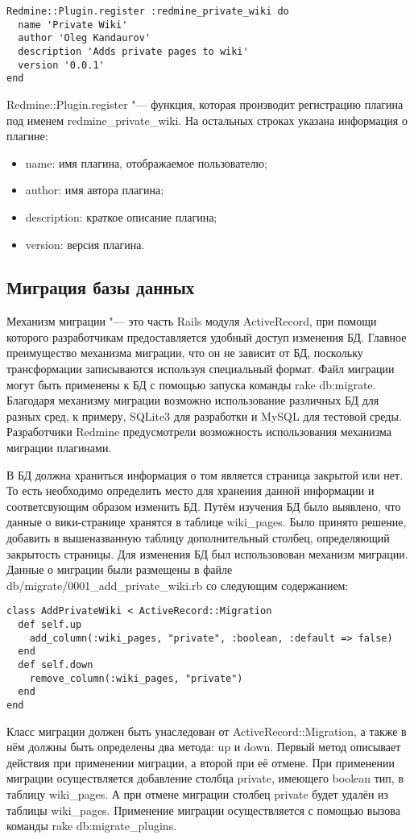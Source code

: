 \small{
\begin{lstlisting}
Redmine::Plugin.register :redmine_private_wiki do
  name 'Private Wiki'
  author 'Oleg Kandaurov'
  description 'Adds private pages to wiki'
  version '0.0.1'
end
\end{lstlisting}}

Redmine::Plugin.register "--- функция, которая производит регистрацию плагина
под именем redmine\_private\_wiki. На остальных строках указана информация о
плагине:
\begin{itemize} 
  \item name: имя плагина, отображаемое пользователю;
  \item author: имя автора плагина;
  \item description: краткое описание плагина;
  \item version: версия плагина.
\end{itemize}

\subsection{Миграция базы данных} 
Механизм миграции "--- это часть Rails модуля ActiveRecord, при помощи которого
разработчикам предоставляется удобный доступ изменения БД. Главное преимущество
механизма миграции, что он не зависит от БД, поскольку трансформации
записываются используя специальный формат. Файл миграции могут быть применены к
БД с помощью запуска команды rake db:migrate. Благодаря механизму миграции
возможно использование различных БД для разных сред, к примеру, SQLite3 для
разработки и MySQL для тестовой среды. Разработчики Redmine предусмотрели
возможность использования механизма миграции плагинами.

В БД должна храниться информация о том является страница закрытой или нет. То
есть необходимо определить место для хранения данной информации и
соответсвующим образом изменить БД. Путём изучения БД было выявлено, что данные
о вики-странице хранятся в таблице wiki\_pages. Было принято решение, добавить
в вышеназванную таблицу дополнительный столбец, определяющий закрытость
страницы. Для изменения БД был использовован механизм миграции. Данные о
миграции были размещены в файле db/migrate/0001\_add\_private\_wiki.rb со
следующим содержанием:

\small{
\begin{lstlisting}
class AddPrivateWiki < ActiveRecord::Migration
  def self.up
    add_column(:wiki_pages, "private", :boolean, :default => false)
  end
  def self.down
    remove_column(:wiki_pages, "private")
  end
end
\end{lstlisting}}
Класс миграции должен быть унаследован от ActiveRecord::Migration, а также в
нём должны быть определены два метода: up и down. Первый метод описывает
действия при применении миграции, а второй при её отмене. При применении
миграции осуществляется добавление столбца private, имеющего boolean тип, в
таблицу wiki\_pages. А при отмене миграции столбец private будет удалён из
таблицы wiki\_pages. Применение миграции осуществляется с помощью вызова
команды rake db:migrate\_plugins.

